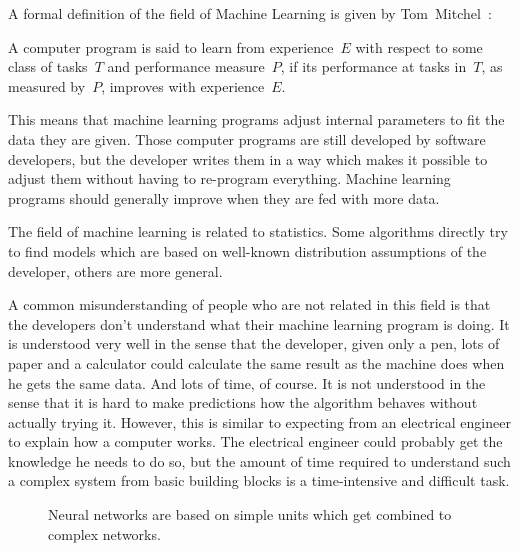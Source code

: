 \documentclass[technote,a4paper,leqno]{IEEEtran}
\begin{document}
A formal definition of the field of Machine Learning is given by
Tom~Mitchel~\cite{Mitchell97}:
\begin{displayquote}
A computer program is said to learn from experience~$E$ with respect to some
class of tasks~$T$ and performance measure~$P$, if its performance at tasks
in~$T$, as measured by~$P$, improves with experience~$E$.
\end{displayquote}

This means that machine learning programs adjust internal parameters to fit the
data they are given. Those computer programs are still developed by software
developers, but the developer writes them in a way which makes it possible to
adjust them without having to re-program everything. Machine learning programs
should generally improve when they are fed with more data.

The field of machine learning is related to statistics. Some algorithms
directly try to find models which are based on well-known distribution
assumptions of the developer, others are more general.

A common misunderstanding of people who are not related in this field is that
the developers don't understand what their machine learning program is doing.
It is understood very well in the sense that the developer, given only a pen,
lots of paper and a calculator could calculate the same result as the machine
does when he gets the same data. And lots of time, of course. It is not
understood in the sense that it is hard to make predictions how the algorithm
behaves without actually trying it. However, this is similar to expecting from
an electrical engineer to explain how a computer works. The electrical engineer
could probably get the knowledge he needs to do so, but the amount of time
required to understand such a complex system from basic building blocks is
a time-intensive and difficult task.

\begin{figure}
\centering
{}%
\caption{Neural networks are based on simple units which get combined to complex networks.}
\label{fig:neural-style}
\end{figure}
\end{document}
